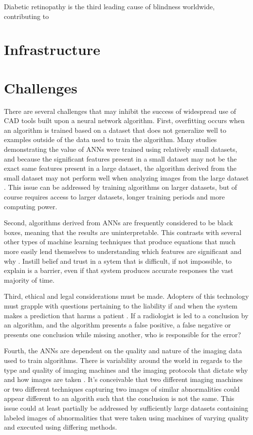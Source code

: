 \documentclass[sigconf]{acmart}
\begin{document}
Diabetic retinopathy is the third leading cause of blindness worldwide, contributing to 

\section{Infrastructure}



\section{Challenges}

There are several challenges that may inhibit the success of widespread use of CAD tools built upon a neural network algorithm. First, overfitting occurs when an algorithm is trained based on a dataset that does not generalize well to examples outside of the data used to train the algorithm. Many studies demonstrating the value of ANNs were trained using relatively small datasets, and because the significant features present in a small dataset may not be the exact same features present in a large dataset, the algorithm derived from the small dataset may not perform well when analyzing images from the large dataset \cite{cite08} \cite{cite05}. This issue can be addressed by training algorithms on larger datasets, but of course requires access to larger datasets, longer training periods and more computing power.

Second, algorithms derived from ANNs are frequently considered to be black boxes, meaning that the results are uninterpretable. This contrasts with several other types of machine learning techniques that produce equations that much more easily lend themselves to understanding which features are significant and why \cite{cite05}. Instill belief and trust in a sytem that is difficult, if not impossible, to explain is a barrier, even if that system produces accurate responses the vast majority of time.

Third, ethical and legal considerations must be made. Adopters of this technology must grapple with questions pertaining to the liability if and when the system makes a prediction that harms a patient \cite{cite05}. If a radiologist is led to a conclusion by an algorithm, and the algorithm presents a false positive, a false negative or presents one conclusion while missing another, who is responsible for the error?

Fourth, the ANNs are dependent on the quality and nature of the imaging data used to train algorithms. There is variability around the world in regards to the type and quality of imaging machines and the imaging protocols that dictate why and how images are taken \cite{cite05}. It's conceivable that two different imaging machines or two different techniques capturing two images of similar abnormalities could appear different to an algorith such that the conclusion is not the same. This issue could at least partially be addressed by sufficiently large datasets containing labeled images of abnormalities that were taken using machines of varying quality and executed using differing methods.  
\end{document}

